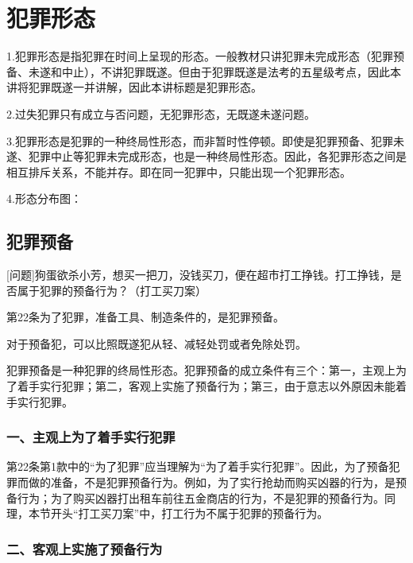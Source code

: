 \chapter{犯罪形态}

\begin{EditionOpeningPanel}
1.犯罪形态是指犯罪在时间上呈现的形态。一般教材只讲犯罪未完成形态（犯罪预备、未遂和中止），不讲犯罪既遂。但由于犯罪既遂是法考的五星级考点，因此本讲将犯罪既遂一并讲解，因此本讲标题是犯罪形态。

2.过失犯罪只有成立与否问题，无犯罪形态，无既遂未遂问题。

3.犯罪形态是犯罪的一种终局性形态，而非暂时性停顿。即使是犯罪预备、犯罪未遂、犯罪中止等犯罪未完成形态，也是一种终局性形态。因此，各犯罪形态之间是相互排斥关系，不能并存。即在同一犯罪中，只能出现一个犯罪形态。


4.形态分布图：

\end{EditionOpeningPanel}

\section{犯罪预备}

[问题]狗蛋欲杀小芳，想买一把刀，没钱买刀，便在超市打工挣钱。打工挣钱，是否属于犯罪的预备行为？（打工买刀案）

第22条为了犯罪，准备工具、制造条件的，是犯罪预备。

对于预备犯，可以比照既遂犯从轻、减轻处罚或者免除处罚。

犯罪预备是一种犯罪的终局性形态。犯罪预备的成立条件有三个：第一，主观上为了着手实行犯罪；第二，客观上实施了预备行为；第三，由于意志以外原因未能着手实行犯罪。

\subsection*{一、主观上为了着手实行犯罪}

第22条第1款中的“为了犯罪”应当理解为“为了着手实行犯罪”。因此，为了预备犯罪而做的准备，不是犯罪预备行为。例如，为了实行抢劫而购买凶器的行为，是预备行为；为了购买凶器打出租车前往五金商店的行为，不是犯罪的预备行为。同理，本节开头“打工买刀案”中，打工行为不属于犯罪的预备行为。

\subsection*{二、客观上实施了预备行为}

